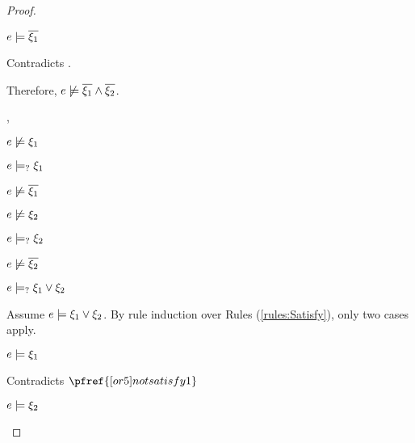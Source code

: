\begin{proof}
\begin{byCases}
\begin{byCases}
\begin{byCases}
        \item[\text{(\ref{rule:CSAnd})}]
            \begin{pfsteps*}
            \item $e \models \overline{\xi_1}$ 
            \end{pfsteps*}
            Contradicts .
        \end{byCases}
        Therefore, $e \not\models \overline{\xi_1} \wedge \overline{\xi_2}$.
    \item[\cmaysatisfy{e}{\xi_1},\cmaysatisfy{e}{\xi_2}]
        \begin{pfsteps*}
        \item $e \not\models \xi_1$  
        \item $e \models_{?} \xi_1$  
        \item $e \not\models \overline{\xi_1}$  
        \item $e \not\models \xi_2$  
        \item $e \models_{?} \xi_2$  
        \item $e \not\models \overline{\xi_2}$  
        \item $e \models_{?} \xi_1 \vee \xi_2$  
        \end{pfsteps*}
        Assume $e \models \xi_1 \vee \xi_2$. By rule induction over Rules (\ref{rules:Satisfy}), only two cases apply.
        \begin{byCases}
        \item[\text{(\ref{rule:CSOr1})}]
            \begin{pfsteps*}
            \item $e \models \xi_1$ 
            \end{pfsteps*}
            Contradicts $\pfref{[or5]notsatisfy1}$
        \item[\text{(\ref{rule:CSOr2})}]
            \begin{pfsteps*}
            \item $e \models \xi_2$ 
            \end{pfsteps*}

\end{byCases}
\end{byCases}
\end{byCases}
\end{proof}
